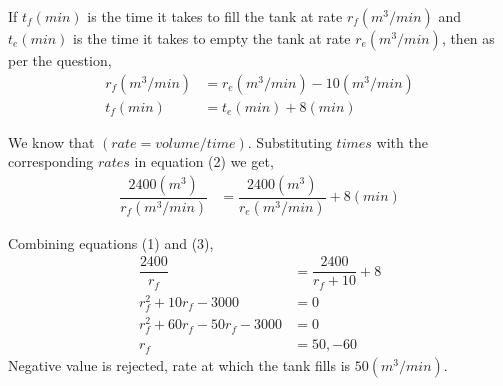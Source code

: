 \begin{solution}
  If $t_f(min)$ is the time it takes to fill the tank at rate $r_f(m^3/min)$ and $t_e(min)$ is the time it takes to empty the tank at rate $r_e(m^3/min)$, then as per the question,
  \begin{align}
    r_f(m^3/min) &= r_e(m^3/min) - 10(m^3/min) \\
    t_f(min)     &= t_e(min)+8(min)
  \end{align}
  
  We know that $(rate=volume/time)$. Substituting $times$ with the corresponding $rates$ in equation (2) we get,
  \begin{align}
    \dfrac{2400(m^3)}{r_f(m^3/min)} &= 
    	\dfrac{2400(m^3)}{r_e(m^3/min)}+8(min) 
  \end{align}
  
  Combining equations (1) and (3),
  \begin{align}      
    \dfrac{2400}{r_f}               &= \dfrac{2400}{r_f+10}+8 \\
    r_f^2 + 10r_f - 3000            &= 0 \\
    r_f^2 + 60r_f -50r_f - 3000     &= 0 \\
    r_f                             &= 50, -60
  \end{align}
  Negative value is rejected, rate at which the tank fills is $50(m^3/min)$.
\end{solution}

